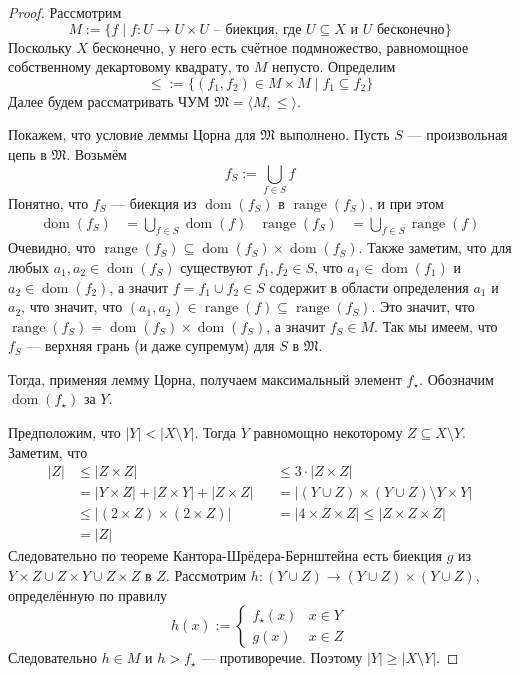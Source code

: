 \documentclass[12pt,a4paper]{article}
\DeclareMathOperator{\dom}{dom}
\DeclareMathOperator{\range}{range}
\begin{document}
    \begin{proof}
        Рассмотрим
        \[M := \{f \mid f: U \to U \times U \text{ -- биекция, где $U \subseteq X$ и $U$ бесконечно}\}\]
        Поскольку $X$ бесконечно, у него есть счётное подмножество, равномощное собственному декартовому квадрату, то $M$ непусто. Определим
        \[{\leqslant} := \{(f_1, f_2) \in M \times M \mid f_1 \subseteq f_2\}\]
        Далее будем рассматривать ЧУМ $\mathfrak{M} = \langle M, \leqslant \rangle$.

        Покажем, что условие леммы Цорна для $\mathfrak{M}$ выполнено. Пусть $S$ --- произвольная цепь в $\mathfrak{M}$. Возьмём
        \[f_S := \bigcup_{f \in S} f\]
        Понятно, что $f_S$ --- биекция из $\dom(f_S)$ в $\range(f_S)$, и при этом
        \begin{align*}
            \dom(f_S) &= \bigcup_{f \in S} \dom(f)&
            \range(f_S) &= \bigcup_{f \in S} \range(f)
        \end{align*}
        Очевидно, что $\range(f_S) \subseteq \dom(f_S) \times \dom(f_S)$. Также заметим, что для любых $a_1, a_2 \in \dom(f_S)$ существуют $f_1, f_2 \in S$, что $a_1 \in \dom(f_1)$ и $a_2 \in \dom(f_2)$, а значит $f = f_1 \cup f_2 \in S$ содержит в области определения $a_1$ и $a_2$, что значит, что $(a_1, a_2) \in \range(f) \subseteq \range(f_S)$. Это значит, что $\range(f_S) = \dom(f_S) \times \dom(f_S)$, а значит $f_S \in M$. Так мы имеем, что $f_S$ --- верхняя грань (и даже супремум) для $S$ в $\mathfrak{M}$.

        Тогда, применяя лемму Цорна, получаем максимальный элемент $f_\star$. Обозначим $\dom(f_\star)$ за $Y$.

        Предположим, что $|Y| < |X \setminus Y|$. Тогда $Y$ равномощно некоторому $Z \subseteq X \setminus Y$. Заметим, что
        \begin{align*}
            |Z|
            &\leqslant |Z \times Z|&
            &\leqslant 3 \cdot |Z \times Z|\\
            &= |Y \times Z| + |Z \times Y| + |Z \times Z|&
            &= |(Y \cup Z) \times (Y \cup Z) \setminus Y \times Y|\\
            &\leqslant |(2 \times Z) \times (2 \times Z)|&
            &= |4 \times Z \times Z| \leqslant |Z \times Z \times Z|\\
            &= |Z|
        \end{align*}
        Следовательно по теореме Кантора-Шрёдера-Бернштейна есть биекция $g$ из $Y \times Z \cup Z \times Y \cup Z \times Z$ в $Z$. Рассмотрим $h: (Y \cup Z) \to (Y \cup Z) \times (Y \cup Z)$, определённую по правилу
        \[h(x) := \begin{cases}
            f_\star(x)& x \in Y\\
            g(x)& x \in Z
        \end{cases}\]
        Следовательно $h \in M$ и $h > f_\star$ --- противоречие. Поэтому $|Y| \geqslant |X \setminus Y|$.


\end{proof}
\end{document}
